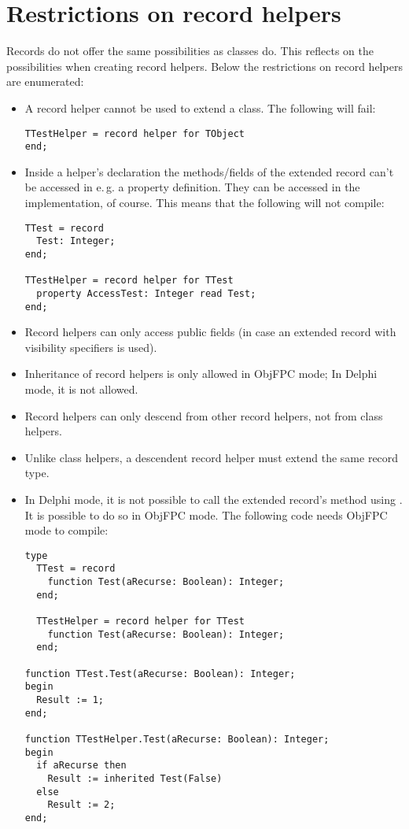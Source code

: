\section{Restrictions on record helpers}
Records do not offer the same possibilities as classes do. This reflects on
the possibilities when creating record helpers. Below the restrictions on
record helpers are enumerated:
\begin{itemize}
\item A record helper cannot be used to extend a class. The following will
fail:
\begin{verbatim}
TTestHelper = record helper for TObject
end;
\end{verbatim}
\item Inside a helper's declaration the methods/fields of the extended record
can't be accessed in e.\,g. a property definition. They can be accessed in the
implementation, of course. This means that the following will not compile:
\begin{verbatim}
TTest = record
  Test: Integer;
end;

TTestHelper = record helper for TTest
  property AccessTest: Integer read Test;
end;
\end{verbatim}
\item Record helpers can only access public fields (in case an extended
record with visibility specifiers is used).
\item Inheritance of record helpers is only allowed in ObjFPC mode; In
Delphi mode, it is not allowed.
\item Record helpers can only descend from other record helpers, not from
class helpers.
\item Unlike class helpers, a descendent record helper must extend the same
record type.
\item In Delphi mode, it is not possible to call the extended record's
method using . It is possible to do so in ObjFPC mode. The
following code needs ObjFPC mode to compile:
\begin{verbatim}
type
  TTest = record
    function Test(aRecurse: Boolean): Integer;
  end;

  TTestHelper = record helper for TTest
    function Test(aRecurse: Boolean): Integer;
  end;

function TTest.Test(aRecurse: Boolean): Integer;
begin
  Result := 1;
end;

function TTestHelper.Test(aRecurse: Boolean): Integer;
begin
  if aRecurse then
    Result := inherited Test(False)
  else
    Result := 2;
end;
\end{verbatim}
\end{itemize}

